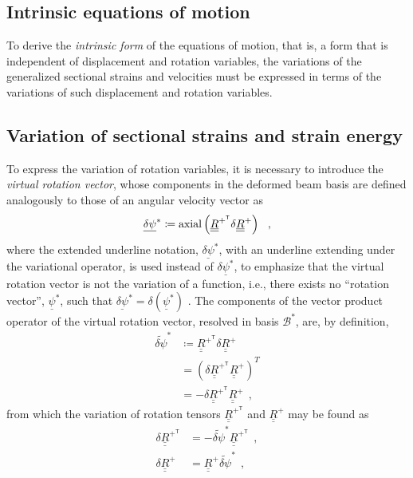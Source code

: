 \documentclass[12pt,a4paper,oneside,english]{abntex2} %
\newcommand{\vect}[1]{\underline{#1}}
\def\tens#1{\underline{\underline{#1}}}
\def\til#1{\widetilde{#1}}
\def\lp{\left(}
\def\rp{\right)}
\def\T{\mathsf{T}}
\def\B*{\mathcal{B}^*}
\def\axial{\textnormal{axial}}
\def\R{\tens{R}}
\def\Rp{\R^+}
\def\RpT{\R^{+^\T}}
\def\delpsi{\vect{\delta\psi}}
\def\delpsis{\delpsi^*}
\def\delpsitil{\til{\delta\psi}}
\def\delpsitils{\delpsitil^*}
\begin{document}
\begin{apendicesenv}

    \chapter{Intrinsic equations of motion}
\label{appendix_ieom}

To derive the \textit{intrinsic form} of the equations of motion, that is, a form that is independent of displacement and rotation variables, the variations of the generalized sectional strains and velocities must be expressed in terms of the variations of such displacement and rotation variables.

\section{Variation of sectional strains and strain energy}
\label{sec:str_U}

To express the variation of rotation variables, it is necessary to introduce the \textit{virtual rotation vector}, whose components in the deformed beam basis are defined analogously to those of an angular velocity vector as
\begin{align}
    \delpsis \coloneqq  \axial\lp\RpT\delta\Rp\rp \ \ ,
    \label{eq:del_psis}
\end{align}
where the extended underline notation, $\delpsis$, with an underline extending under the variational operator, is used instead of $\delta\vect{\psi}^*$, to emphasize that the virtual rotation vector is not the variation of a function, i.e., there exists no ``rotation vector'', $\vect{\psi}^*$, such that $\delpsis = \delta\lp\vect{\psi}^*\rp$ \cite{bauchau2011flexible}. The components of the vector product operator of the virtual rotation vector, resolved in basis $\B*$, are, by definition,
\begin{align}
    \delpsitils &\coloneqq  \RpT\delta\Rp \nonumber 
    \\
    &= \lp\delta\RpT\Rp\rp^T 
    \nonumber 
    \\
    &= -\delta\RpT\Rp \ \ ,
    \label{eq:del_psitils}
\end{align}
from which the variation of rotation tensors $\RpT$ and $\Rp$ may be found as
\begin{align}
    \delta\RpT &= -\delpsitils\RpT \ \ , \label{eq:del_RpT} 
    \\
    \delta\Rp &= \Rp\delpsitils \ \ ,
    \label{eq:del_Rp}
\end{align}


\end{apendicesenv}
\end{document}
